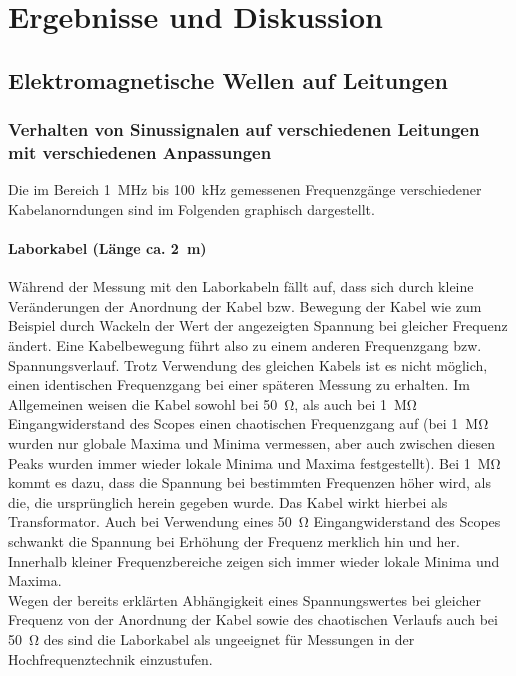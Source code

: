 \documentclass[a4paper,twoside,final]{article}
\begin{document}
\newpage
\section{Ergebnisse und Diskussion}
\subsection{Elektromagnetische Wellen auf Leitungen}
\subsubsection{Verhalten von Sinussignalen auf verschiedenen Leitungen mit verschiedenen Anpassungen}
Die im Bereich \SI{1}{\mega\hertz} bis \SI{100}{\kilo\hertz} gemessenen Frequenzgänge verschiedener Kabelanorndungen sind im Folgenden graphisch dargestellt.
\paragraph{Laborkabel (Länge ca. \SI{2}{\meter})}


Während der Messung mit den Laborkabeln fällt auf, dass sich durch kleine Veränderungen der Anordnung der Kabel bzw. Bewegung der Kabel wie zum Beispiel durch Wackeln der Wert der angezeigten Spannung bei gleicher Frequenz ändert. Eine Kabelbewegung führt also zu einem anderen Frequenzgang bzw. Spannungsverlauf. Trotz Verwendung des gleichen Kabels ist es nicht möglich, einen identischen Frequenzgang bei einer späteren Messung zu erhalten.
Im Allgemeinen weisen die Kabel sowohl bei \SI{50}{\ohm}, als auch bei \SI{1}{\mega\ohm} Eingangwiderstand des Scopes einen chaotischen Frequenzgang auf (bei \SI{1}{\mega\ohm} wurden nur globale Maxima und Minima vermessen, aber auch zwischen diesen Peaks wurden immer wieder lokale Minima und Maxima festgestellt). Bei \SI{1}{\mega\ohm} kommt es dazu, dass die Spannung bei bestimmten Frequenzen höher wird, als die, die ursprünglich herein gegeben wurde. Das Kabel wirkt hierbei als Transformator.
Auch bei Verwendung eines \SI{50}{\ohm} Eingangwiderstand des Scopes schwankt die Spannung bei Erhöhung der Frequenz merklich hin und her. Innerhalb kleiner Frequenzbereiche zeigen sich immer wieder lokale Minima und Maxima.\\
Wegen der bereits erklärten Abhängigkeit eines Spannungswertes bei gleicher Frequenz von der Anordnung der Kabel sowie des chaotischen Verlaufs auch bei \SI{50}{\ohm} des sind die Laborkabel als ungeeignet für Messungen in der Hochfrequenztechnik einzustufen.
\end{document}
